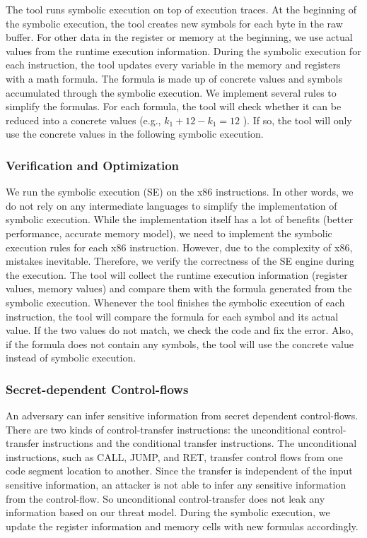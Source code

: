 The tool runs symbolic execution on top of execution traces. At the beginning of the symbolic execution, the tool creates new symbols for each byte in the raw buffer. For other data in the register or memory at the beginning, we use actual values from the runtime execution information. During the symbolic execution for each instruction, the tool updates every variable in the memory and registers with a math formula. The formula is made up of concrete values and symbols accumulated through the symbolic execution. We implement several rules to simplify the formulas. For each formula, the tool will check whether it can be reduced into a concrete values (e.g., $k_1+12-k_1 = 12$ ). If so, the tool will only use the concrete values in the following symbolic execution.

\subsubsection{Verification and Optimization}
We run the symbolic execution (SE) on the x86 instructions. In other words, we do not rely on any intermediate languages to simplify the implementation of symbolic execution. While the implementation itself has a lot of benefits (better performance, accurate memory model), we need to implement the symbolic execution rules for each x86 instruction.
However, due to the complexity of x86, mistakes inevitable. Therefore, we verify the correctness of the SE engine during the execution.
The tool will collect the runtime execution information (register values, memory values) and compare them with the formula generated from the symbolic execution. Whenever the tool finishes the symbolic execution of each instruction, the tool will compare the formula for each symbol and its actual value. If the two values do not match, we check the code and fix the error. Also, if the formula does not contain any symbols, the tool will use the concrete value instead of symbolic execution.

\subsubsection{Secret-dependent Control-flows}
An adversary can infer sensitive information from secret dependent control-flows. There are two kinds of control-transfer instructions: the unconditional control-transfer instructions and the conditional transfer instructions.
The unconditional instructions, such as CALL, JUMP, and RET, transfer control flows from one code segment location to another. Since the transfer is independent of the input sensitive information, an attacker is not able to infer any sensitive information from the control-flow.
So unconditional control-transfer does not leak any information based on our threat model. During the symbolic execution, we update the register information and memory cells with new formulas accordingly.

